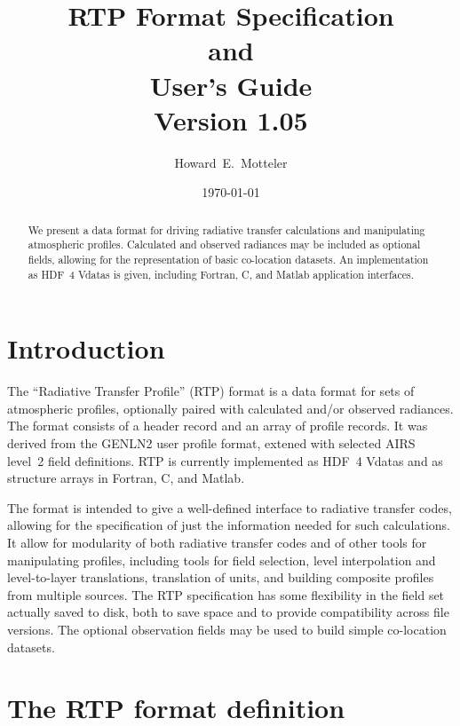 \documentclass[12pt]{article}
\title{{\bf RTP Format Specification\\
		and\\
	User's Guide}\bigskip\bigskip \\
        {Version 1.05}\bigskip \\ }
\author{Howard~E.~Motteler}
\date{\today\vspace{1cm}}
\begin{document}
\maketitle

\begin{abstract}

We present a data format for driving radiative transfer calculations
and manipulating atmospheric profiles.  Calculated and observed
radiances may be included as optional fields, allowing for the
representation of basic co-location datasets.  An implementation as
HDF~4 Vdatas is given, including Fortran, C, and Matlab application
interfaces.

\end{abstract}


\section{Introduction}

The ``Radiative Transfer Profile'' (RTP) format is a data format for
sets of atmospheric profiles, optionally paired with calculated
and/or observed radiances.  The format consists of a header record
and an array of profile records.  It was derived from the GENLN2
user profile format, extened with selected AIRS level~2 field
definitions.  RTP is currently implemented as HDF~4 Vdatas and as
structure arrays in Fortran, C, and Matlab.

The format is intended to give a well-defined interface to radiative
transfer codes, allowing for the specification of just the
information needed for such calculations.  It allow for modularity
of both radiative transfer codes and of other tools for manipulating
profiles, including tools for field selection, level interpolation
and level-to-layer translations, translation of units, and building
composite profiles from multiple sources.  The RTP specification has
some flexibility in the field set actually saved to disk, both to
save space and to provide compatibility across file versions.  The
optional observation fields may be used to build simple co-location
datasets.


\section{The RTP format definition}
\end{document}
